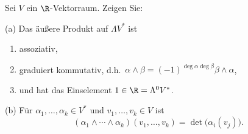                         \begin{prob}
Sei $V$ ein $\R$-Vektorraum. Zeigen Sie:

(a) Das \"au\ss ere Produkt auf $\Lambda V^*$ ist
\begin{enumerate}
\item assoziativ,
\item graduiert kommutativ,
d.h.~$\alpha\wedge\beta=(-1)^{\deg\alpha\deg\beta}\beta\wedge\alpha$,
\item und hat das Einselement $1\in\R=\Lambda^0V^*$. 
\end{enumerate}
(b) F\"ur $\alpha_1,\dots,\alpha_k\in V^*$ und $v_1,\dots,v_k\in V$ ist
$$
   (\alpha_1\wedge\cdots\wedge\alpha_k)(v_1,\dots,v_k) = \det\bigl(\alpha_i(v_j)\bigr).
$$
\end{prob}
